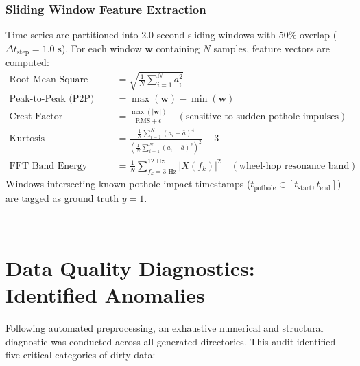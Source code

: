 \documentclass[11pt,a4paper]{article}
\begin{document}
\subsubsection{Sliding Window Feature Extraction}
Time-series are partitioned into 2.0-second sliding windows with 50\% overlap ($\Delta t_{\text{step}} = 1.0\text{ s}$). For each window $\mathbf{w}$ containing $N$ samples, feature vectors are computed:
\begin{align}
\text{Root Mean Square (RMS)} & = \sqrt{\frac{1}{N}\sum_{i=1}^N a_i^2} \\
\text{Peak-to-Peak (P2P)} & = \max(\mathbf{w}) - \min(\mathbf{w}) \\
\text{Crest Factor} & = \frac{\max(|\mathbf{w}|)}{\text{RMS} + \epsilon} \quad (\text{sensitive to sudden pothole impulses}) \\
\text{Kurtosis} & = \frac{\frac{1}{N}\sum_{i=1}^N (a_i - \bar{a})^4}{\left(\frac{1}{N}\sum_{i=1}^N (a_i - \bar{a})^2\right)^2} - 3 \\
\text{FFT Band Energy} & = \frac{1}{N}\sum_{f_k=3\text{ Hz}}^{12\text{ Hz}} |X(f_k)|^2 \quad (\text{wheel-hop resonance band})
\end{align}
Windows intersecting known pothole impact timestamps ($t_{\text{pothole}} \in [t_{\text{start}}, t_{\text{end}}]$) are tagged as ground truth $y=1$.

---

\section{Data Quality Diagnostics: Identified Anomalies}

Following automated preprocessing, an exhaustive numerical and structural diagnostic was conducted across all generated directories. This audit identified five critical categories of dirty data:
\end{document}
